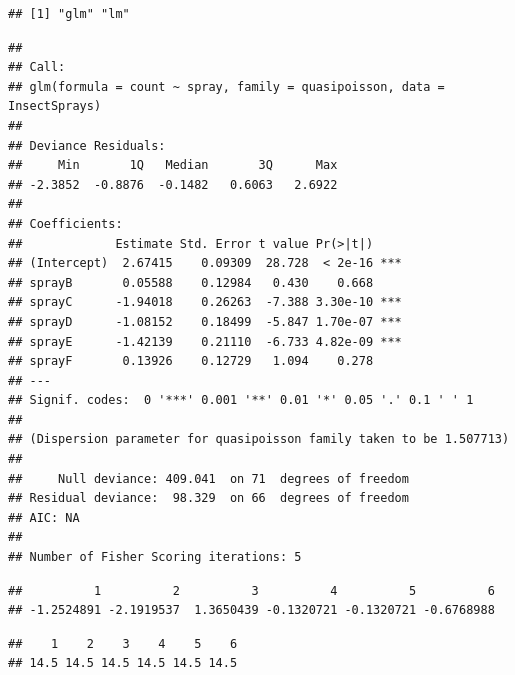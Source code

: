 \documentclass[krantz2]{krantz}\usepackage{knitr}%
\begin{document}
\begin{knitrout}\footnotesize
{}\color{fgcolor}\begin{kframe}
\begin{alltt}
\end{alltt}
\begin{verbatim}
## [1] "glm" "lm"
\end{verbatim}
\begin{alltt}
\end{alltt}
\begin{verbatim}
## 
## Call:
## glm(formula = count ~ spray, family = quasipoisson, data = InsectSprays)
## 
## Deviance Residuals: 
##     Min       1Q   Median       3Q      Max  
## -2.3852  -0.8876  -0.1482   0.6063   2.6922  
## 
## Coefficients:
##             Estimate Std. Error t value Pr(>|t|)    
## (Intercept)  2.67415    0.09309  28.728  < 2e-16 ***
## sprayB       0.05588    0.12984   0.430    0.668    
## sprayC      -1.94018    0.26263  -7.388 3.30e-10 ***
## sprayD      -1.08152    0.18499  -5.847 1.70e-07 ***
## sprayE      -1.42139    0.21110  -6.733 4.82e-09 ***
## sprayF       0.13926    0.12729   1.094    0.278    
## ---
## Signif. codes:  0 '***' 0.001 '**' 0.01 '*' 0.05 '.' 0.1 ' ' 1
## 
## (Dispersion parameter for quasipoisson family taken to be 1.507713)
## 
##     Null deviance: 409.041  on 71  degrees of freedom
## Residual deviance:  98.329  on 66  degrees of freedom
## AIC: NA
## 
## Number of Fisher Scoring iterations: 5
\end{verbatim}
\begin{alltt}
\hlstd{(}
\end{alltt}
\begin{verbatim}
##          1          2          3          4          5          6 
## -1.2524891 -2.1919537  1.3650439 -0.1320721 -0.1320721 -0.6768988
\end{verbatim}
\begin{alltt}
\hlstd{(}
\end{alltt}
\begin{verbatim}
##    1    2    3    4    5    6 
## 14.5 14.5 14.5 14.5 14.5 14.5
\end{verbatim}
\end{kframe}
\end{knitrout}
\end{document}

